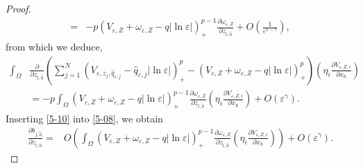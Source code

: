\documentclass[12pt,reqno]{amsart}
\numberwithin{equation}{section}
\theoremstyle{definition}
\theoremstyle{remark}
\begin{document}
\begin{proof}
\begin{equation*}
\begin{split}
=&-p\left (V_{\varepsilon,Z}+\omega_{\varepsilon,Z}-q|\ln\varepsilon|\right )^{p-1}_+\frac{\partial \omega_{\varepsilon,Z} }{\partial z_{l,\bar{h}}}+O\left( \frac{1}{\varepsilon^{1-\gamma}}\right),
\end{split}
\end{equation*}
from which we deduce,
\begin{equation}\label{5-10}
\begin{split}
\int_\Omega&\frac{\partial }{\partial z_{l,\bar{h}}}\left( \sum_{j=1}^N\left (V_{\varepsilon, z_j, \hat{q}_{\varepsilon,j}}-\hat{q}_{\varepsilon,j}|\ln\varepsilon|\right )^{p}_+-\left (V_{\varepsilon,Z}+\omega_{\varepsilon,Z}-q|\ln\varepsilon|\right )^{p}_+\right) \left( \eta_i\frac{\partial V_{\varepsilon, Z,i}}{\partial x_\hbar}\right)\\
&=-p\int_\Omega \left (V_{\varepsilon,Z}+\omega_{\varepsilon,Z}-q|\ln\varepsilon|\right )^{p-1}_+\frac{\partial \omega_{\varepsilon,Z} }{\partial z_{l,\bar{h}}}\left( \eta_i\frac{\partial V_{\varepsilon, Z,i}}{\partial x_\hbar}\right)+O\left( \varepsilon^\gamma\right).
\end{split}
\end{equation}
Inserting \eqref{5-10} into \eqref{5-08}, we obtain
\begin{equation}\label{5-11}
\begin{split}
\frac{\partial b_{j,\tilde{h}}}{\partial z_{l,\bar{h}}}=&O\left( \int_\Omega \left (V_{\varepsilon,Z}+\omega_{\varepsilon,Z}-q|\ln\varepsilon|\right )^{p-1}_+\frac{\partial \omega_{\varepsilon,Z} }{\partial z_{l,\bar{h}}}\left( \eta_i\frac{\partial V_{\varepsilon, Z,i}}{\partial x_\hbar}\right)\right) +O\left( \varepsilon^\gamma\right).
\end{split}
\end{equation}


\end{proof}
\end{document}
